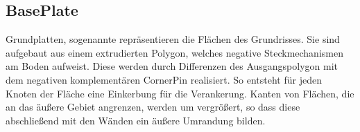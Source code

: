 \subsection{BasePlate}
Grundplatten, sogenannte  repräsentieren die Flächen des Grundrisses.
Sie sind aufgebaut aus einem extrudierten Polygon, welches negative Steckmechanismen am Boden aufweist.
Diese werden durch Differenzen des Ausgangspolygon mit dem negativen komplementären CornerPin realisiert.
So entsteht für jeden Knoten der Fläche eine Einkerbung für die Verankerung.
Kanten von Flächen, die an das äußere Gebiet angrenzen, werden um  vergrößert, so dass diese  abschließend mit den Wänden ein äußere Umrandung bilden.
